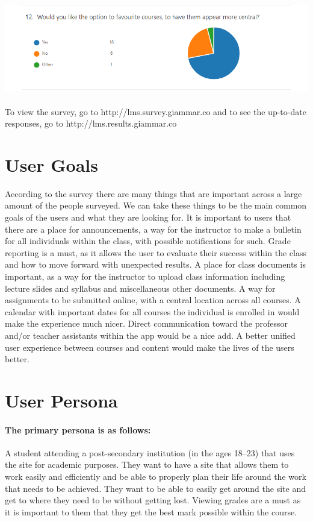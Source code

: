 \documentclass[12pt]{article}
\begin{document}
    \includegraphics[width=\textwidth]{survey/12.png}

    \paragraph{}
    To view the survey, go to http://lms.survey.giammar.co and to see the up-to-date\\responses, go to http://lms.results.giammar.co


    \section{User Goals}\label{sec:user-goals}

    According to the survey there are many things that are important across a large amount of the people surveyed.
    We can take these things to be the main common goals of the users and what they are looking for.
    It is important to users that there are a place for announcements, a way for the instructor to make a bulletin for all individuals within the class, with possible notifications for such.
    Grade reporting is a must, as it allows the user to evaluate their success within the class and how to move forward with unexpected results.
    A place for class documents is important, as a way for the instructor to upload class information including lecture slides and syllabus and miscellaneous other documents.
    A way for assignments to be submitted online, with a central location across all courses.
    A calendar with important dates for all courses the individual is enrolled in would make the experience much nicer.
    Direct communication toward the professor and/or teacher assistants within the app would be a nice add.
    A better unified user experience between courses and content would make the lives of the users better.


    \section{User Persona}\label{sec:user-persona}

    \paragraph{The primary persona is as follows:} A student attending a post-secondary institution (in the ages 18--23) that uses the site for academic purposes.
    They want to have a site that allows them to work easily and efficiently and be able to properly plan their life around the work that needs to be achieved.
    They want to be able to easily get around the site and get to where they need to be without getting lost.
    Viewing grades are a must as it is important to them that they get the best mark possible within the course.
\end{document}
